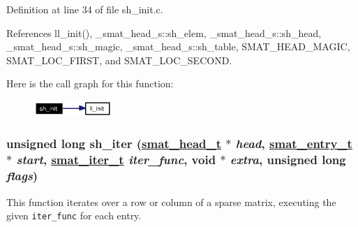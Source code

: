 Definition at line 34 of file sh\_\-init.c.

References ll\_\-init(), \_\-smat\_\-head\_\-s::sh\_\-elem, \_\-smat\_\-head\_\-s::sh\_\-head, \_\-smat\_\-head\_\-s::sh\_\-magic, \_\-smat\_\-head\_\-s::sh\_\-table, SMAT\_\-HEAD\_\-MAGIC, SMAT\_\-LOC\_\-FIRST, and SMAT\_\-LOC\_\-SECOND.

Here is the call graph for this function:\begin{figure}[H]
\begin{center}
\leavevmode
\includegraphics[width=83pt]{group__dbprim__smat_ga18_cgraph}
\end{center}
\end{figure}
\hypertarget{group__dbprim__smat_ga21}{
\subsubsection[sh\_\-iter]{\setlength{\rightskip}{0pt plus 5cm}unsigned long sh\_\-iter (\hyperlink{struct__smat__head__s}{smat\_\-head\_\-t} $\ast$ {\em head}, \hyperlink{struct__smat__entry__s}{smat\_\-entry\_\-t} $\ast$ {\em start}, \hyperlink{group__dbprim__smat_ga4}{smat\_\-iter\_\-t} {\em iter\_\-func}, void $\ast$ {\em extra}, unsigned long {\em flags})}}
\label{group__dbprim__smat_ga21}


This function iterates over a row or column of a sparse matrix, executing the given {\tt iter\_\-func} for each entry.


